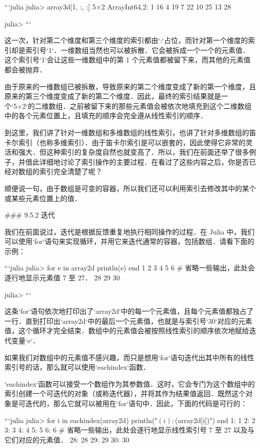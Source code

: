 ```julia
julia> array3d[1, :, :]
5×2 Array{Int64,2}:
  1  16
  4  19
  7  22
 10  25
 13  28

julia> 
```

这一次，针对第二个维度和第三个维度的索引都由`:`占位，而针对第一个维度的索引却是索引号`1`．一维数组当然也可以被拆散．它会被拆成一个一个的元素值．这个索引号`1`会让这些一维数组中的第 1 个元素值都被留下来，而其他的元素值都会被抛弃．

由于原来的一维数组已被拆散，导致原来的第二个维度变成了新的第一个维度，且原来的第三个维度变成了新的第二个维度．因此，最终的索引结果就是一个`5×2`的二维数组．之前被留下来的那些元素值会被依次地填充到这个二维数组中的各个元素位置上，且填充的顺序会完全遵从线性索引的顺序．

到这里，我们讲了针对一维数组和多维数组的线性索引，也讲了针对多维数组的笛卡尔索引（也称多维索引）．由于笛卡尔索引是可以嵌套的，因此使得它非常的灵活和强大．但这种索引的复杂度自然也就变高了．所以，我们在前面还举了很多例子，并借此详细地讨论了索引操作的主要过程．在看过了这些内容之后，你是否已经对数组的索引完全清楚了呢？

顺便说一句，由于数组是可变的容器，所以我们还可以利用索引去修改其中的某个或某些元素位置上的值．

### 9.5.2 迭代

我们在前面说过，迭代是根据反馈重复地执行相同操作的过程．在 Julia 中，我们可以使用`for`语句来实现循环，并用它来迭代通常的容器，包括数组．请看下面的示例：

```julia
julia> for e in array2d
           println(e)
       end
1
2
3
4
5
6
# 省略一些输出，此处会逐行地显示元素值 7 至 27．
28
29
30

julia> 
```

这条`for`语句依次地打印出了`array2d`中的每一个元素值，且每个元素值都独占了一行．直到打印出`array2d`中的最后一个元素值，也就是与索引号`30`对应的元素值，这个循环才完全结束．数组中的元素值会被按照线性索引的顺序依次地赋给迭代变量`e`．

如果我们对数组中的元素值不感兴趣，而只是想用`for`语句迭代出其中所有的线性索引号的话，那么就可以使用`eachindex`函数．

`eachindex`函数可以接受一个数组作为其参数值．这时，它会专门为这个数组中的索引创建一个可迭代的对象（或称迭代器），并将其作为结果值返回．既然这个对象是可迭代的，那么它就可以被用在`for`语句中．因此，下面的代码是可行的：

```julia
julia> for i in eachindex(array2d)
           println("$(i): $(array2d[i])")
       end
1: 1
2: 2
3: 3
4: 4
5: 5
6: 6
# 省略一些输出，此处会逐行地显示线性索引号 7 至 27 以及与它们对应的元素值．
28: 28
29: 29
30: 30

